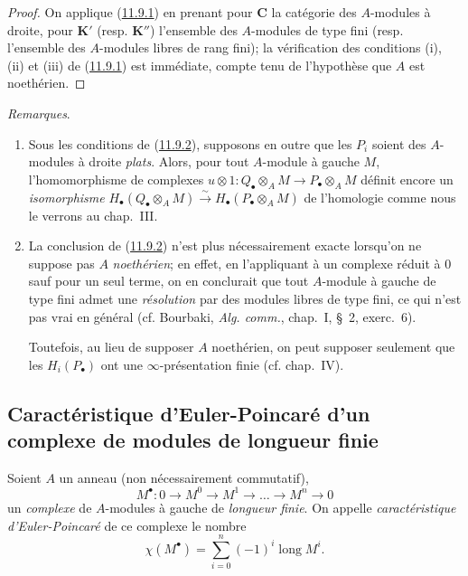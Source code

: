 \begin{proof}
On applique (\hyperref[0.11.9.1-fr]{11.9.1}) en prenant pour $\boldsymbol{C}$ la
catégorie des $A$-modules à droite, pour $\boldsymbol{K}'$ (resp. $\boldsymbol{K}''$) l'ensemble des
$A$-modules de type fini (resp. l'ensemble des $A$-modules libres de rang
fini); la vérification des conditions (i), (ii) et (iii) de
(\hyperref[0.11.9.1-fr]{11.9.1}) est immédiate, compte tenu de l'hypothèse
que $A$ est noethérien.
\end{proof}

\begin{env}[11.9.3]
\label{0.11.9.3-fr}
\emph{Remarques}.
\begin{enumerate}
\item[{\rm(i)}] Sous les conditions de
(\hyperref[0.11.9.2-fr]{11.9.2}), supposons en outre que les $P_i$ soient des
$A$-modules à droite \emph{plats}. Alors, pour tout $A$-module à gauche $M$,
l'homomorphisme de complexes
$u\otimes 1:Q_\bullet\otimes_A M\to P_\bullet\otimes_A M$
définit encore un \emph{isomorphisme}
$H_\bullet(Q_\bullet\otimes_A M)\xrightarrow{\sim}
H_\bullet(P_\bullet\otimes_A M)$ de l'homologie comme nous le verrons au
chap.~III.
\item[{\rm(ii)}] La conclusion de (\hyperref[0.11.9.2-fr]{11.9.2}) n'est
plus nécessairement exacte lorsqu'on ne suppose pas $A$ \emph{noethérien}; en
effet, en l'appliquant à un complexe réduit à $0$ sauf pour un seul terme, on
en conclurait que tout $A$-module à gauche de type fini admet une \emph{résolution}
par des modules libres de type fini, ce qui n'est pas vrai en général
(cf. Bourbaki, \emph{Alg. comm.}, chap.~I, \S~2, exerc.~6).

Toutefois, au lieu de supposer $A$ noethérien, on peut supposer seulement que
les $H_i(P_\bullet)$ ont une $\infty$-présentation finie (cf. chap.~IV).
\end{enumerate}
\end{env}

\subsection{Caractéristique d'Euler-Poincaré d'un complexe de modules de
longueur finie}
\label{subsection:0.11.10-fr}

\begin{env}[11.10.1]
\label{0.11.10.1-fr}
Soient $A$ un anneau (non nécessairement commutatif),
\[
\label{0.11.10.1.1-fr}
\tag{11.10.1.1}
M^\bullet:0\longrightarrow M^0\longrightarrow M^1
\longrightarrow\ldots\longrightarrow M^n\longrightarrow0
\]
un \emph{complexe} de $A$-modules à gauche de \emph{longueur finie}. On appelle
\emph{caractéristique d'Euler-Poincaré} de ce complexe le nombre
\[
\label{0.11.10.1.2-fr}
\tag{11.10.1.2}
\chi(M^\bullet)=\sum_{i=0}^{n}(-1)^i\operatorname{long}M^i.
\]
\end{env}

